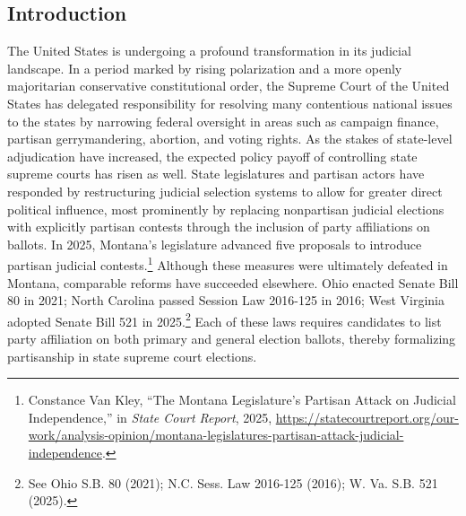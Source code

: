 \subsection{Introduction}\label{introduction}

The United States is undergoing a profound transformation in its
judicial landscape. In a period marked by rising polarization and a more
openly majoritarian conservative constitutional order, the Supreme Court
of the United States has delegated responsibility for resolving many
contentious national issues to the states by narrowing federal oversight
in areas such as campaign finance, partisan gerrymandering, abortion,
and voting rights. As the stakes of state-level adjudication have
increased, the expected policy payoff of controlling state supreme
courts has risen as well. State legislatures and partisan actors have
responded by restructuring judicial selection systems to allow for
greater direct political influence, most prominently by replacing
nonpartisan judicial elections with explicitly partisan contests through
the inclusion of party affiliations on ballots. In 2025, Montana's
legislature advanced five proposals to introduce partisan judicial
contests.\footnote{Constance Van Kley, {``The {Montana Legislature}'s
  {Partisan Attack} on {Judicial Independence},''} in \emph{State Court
  Report}, 2025,
  \url{https://statecourtreport.org/our-work/analysis-opinion/montana-legislatures-partisan-attack-judicial-independence}.}
Although these measures were ultimately defeated in Montana, comparable
reforms have succeeded elsewhere. Ohio enacted Senate Bill 80 in 2021;
North Carolina passed Session Law 2016-125 in 2016; West Virginia
adopted Senate Bill 521 in 2025.\footnote{See Ohio S.B. 80 (2021); N.C.
  Sess. Law 2016-125 (2016); W. Va. S.B. 521 (2025).} Each of these laws
requires candidates to list party affiliation on both primary and
general election ballots, thereby formalizing partisanship in state
supreme court elections.

